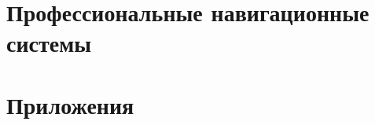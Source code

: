 \documentclass[
    fontsize=14pt,
    DIV=12,
    headings=big,
    numbers=noenddot,
    toc=listof,
    toc=bib,
    headinclude=true,
    footinclude=false
]{scrartcl}
\begin{document}








\clearpage




\clearpage









\clearpage

\part{Профессиональные навигационные системы}


\clearpage

\clearpage

\clearpage

\clearpage

\clearpage

\clearpage

\part{Приложения}
\appendix


\clearpage

\clearpage

\clearpage

\clearpage

\nocite{*}
\printbibliography[heading=bibintoc, title={Список литературы}]
\end{document}
